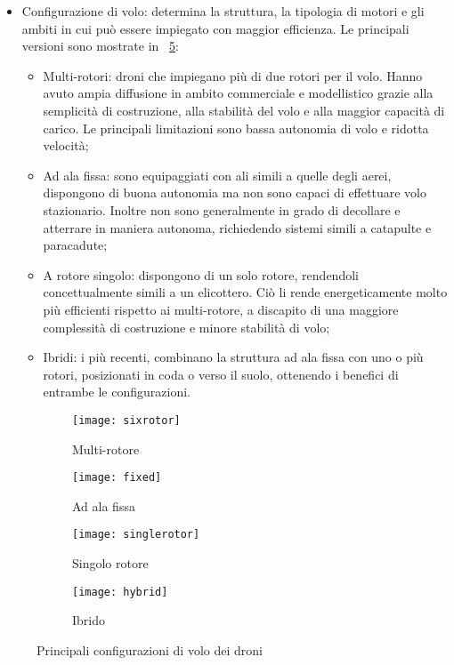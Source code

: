 \begin{itemize}
\begin{itemize}
		\end{itemize}
	\item Configurazione di volo: determina la struttura, la tipologia di motori e gli ambiti in cui può essere impiegato con maggior efficienza. Le principali versioni sono mostrate in \figurename\ \ref{fig:struttura}: 
		\begin{itemize}
			\item Multi-rotori: droni che impiegano più di due rotori per il volo. Hanno avuto ampia diffusione in ambito commerciale e modellistico grazie alla semplicità di costruzione, alla stabilità del volo e alla maggior capacità di carico. Le principali limitazioni sono bassa autonomia di volo e ridotta velocità;
			\item Ad ala fissa: sono equipaggiati con ali simili a quelle degli aerei, dispongono di buona autonomia ma non sono capaci di effettuare volo stazionario. Inoltre non sono generalmente in grado di decollare e atterrare in maniera autonoma, richiedendo sistemi simili a catapulte e paracadute;
			\item A rotore singolo: dispongono di un solo rotore, rendendoli concettualmente simili a un elicottero. Ciò li rende energeticamente molto più efficienti rispetto ai multi-rotore, a discapito di una maggiore complessità di costruzione e minore stabilità di volo;
			\item Ibridi: i più recenti, combinano la struttura ad ala fissa con uno o più rotori, posizionati in coda o verso il suolo, ottenendo i benefici di entrambe le configurazioni. 
		\end{itemize}
\end{itemize}
%
\begin{figure}
	\centering
	\begin{subfigure}[b]{0.4\textwidth}
		\centering
		\texttt{[image: sixrotor]}
		\caption{Multi-rotore}
		\label{fig:multirotor}
	\end{subfigure}
	\begin{subfigure}[b]{0.4\textwidth}
		\centering
		\texttt{[image: fixed]}
		\caption{Ad ala fissa}
		\label{fig:fixed}
	\end{subfigure}
	\begin{subfigure}[b]{0.4\textwidth}
		\centering
		\texttt{[image: singlerotor]}
		\caption{Singolo rotore}
		\label{fig:singlerotor}
	\end{subfigure}
	\begin{subfigure}[b]{0.4\textwidth}
		\centering
		\texttt{[image: hybrid]}
		\caption{Ibrido}
		\label{fig:hybrid}
	\end{subfigure}
	\caption{Principali configurazioni di volo dei droni}
	\label{fig:struttura}
\end{figure}
%
